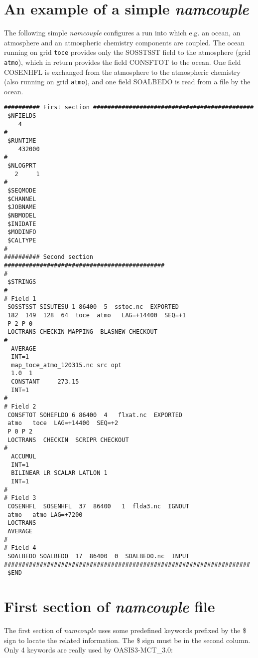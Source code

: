 \section{An example of a simple {\it namcouple}}
\label{subsec_examplenamcouple}

The following simple {\it namcouple} configures a run into which e.g. an
ocean, an atmosphere and an atmospheric chemistry components are
coupled. The ocean running on grid {\tt toce} provides only the SOSSTSST field to the atmosphere (grid {\tt atmo}),
which in return provides the field CONSFTOT to the ocean. One field
COSENHFL is exchanged from the atmosphere to the atmospheric
chemistry (also running on grid {\tt atmo}), and one field SOALBEDO is read from a file by the ocean.

\begin{verbatim}
########## First section #############################################
 $NFIELDS
    4  
#
 $RUNTIME
    432000
#
 $NLOGPRT
   2     1
#
 $SEQMODE
 $CHANNEL
 $JOBNAME
 $NBMODEL
 $INIDATE
 $MODINFO
 $CALTYPE
#
########## Second section #############################################
#
 $STRINGS
#
# Field 1
 SOSSTSST SISUTESU 1 86400  5  sstoc.nc  EXPORTED
 182  149  128  64  toce  atmo   LAG=+14400  SEQ=+1
 P 2 P 0
 LOCTRANS CHECKIN MAPPING  BLASNEW CHECKOUT 
#
  AVERAGE 
  INT=1
  map_toce_atmo_120315.nc src opt
  1.0  1
  CONSTANT     273.15 
  INT=1
#
# Field 2
 CONSFTOT SOHEFLDO 6 86400  4   flxat.nc  EXPORTED
 atmo   toce  LAG=+14400  SEQ=+2
 P 0 P 2
 LOCTRANS  CHECKIN  SCRIPR CHECKOUT
#
  ACCUMUL 
  INT=1
  BILINEAR LR SCALAR LATLON 1
  INT=1
#
# Field 3
 COSENHFL  SOSENHFL  37  86400   1  flda3.nc  IGNOUT 
 atmo   atmo LAG=+7200 
 LOCTRANS
 AVERAGE
#
# Field 4
 SOALBEDO SOALBEDO  17  86400  0  SOALBEDO.nc  INPUT
#####################################################################
 $END
\end{verbatim}


\section{ First section of {\it namcouple} file}
\label{subsec_namcouplefirst}

The first section of {\it namcouple } uses some predefined keywords
prefixed by the \$ sign to locate the related information. The \$ sign
must be in the second column. Only 4 keywords are really used by OASIS3-MCT\_3.0:

